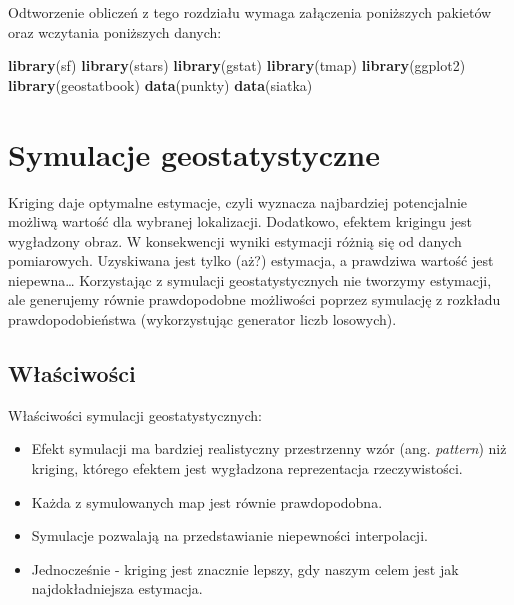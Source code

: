 \documentclass[
  paper=6in:9in,pagesize=pdftex,headinclude=on,footinclude=on,10pt]{scrbook}
\newenvironment{Shaded}{\begin{snugshade}}{\end{snugshade}}
\newcommand{\FunctionTok}[1]{\textcolor[rgb]{0.13,0.29,0.53}{\textbf{#1}}}
\newcommand{\NormalTok}[1]{#1}
\providecommand{\tightlist}{%
  \setlength{\itemsep}{0pt}\setlength{\parskip}{0pt}}
\begin{document}
Odtworzenie obliczeń z tego rozdziału wymaga załączenia poniższych pakietów oraz wczytania poniższych danych:

\begin{Shaded}
\begin{Highlighting}[]
\FunctionTok{library}\NormalTok{(sf)}
\FunctionTok{library}\NormalTok{(stars)}
\FunctionTok{library}\NormalTok{(gstat)}
\FunctionTok{library}\NormalTok{(tmap)}
\FunctionTok{library}\NormalTok{(ggplot2)}
\FunctionTok{library}\NormalTok{(geostatbook)}
\FunctionTok{data}\NormalTok{(punkty)}
\FunctionTok{data}\NormalTok{(siatka)}
\end{Highlighting}
\end{Shaded}

\section{Symulacje geostatystyczne}\label{symulacje-geostatystyczne}

Kriging daje optymalne estymacje, czyli wyznacza najbardziej potencjalnie możliwą wartość dla wybranej lokalizacji.
Dodatkowo, efektem krigingu jest wygładzony obraz.
W konsekwencji wyniki estymacji różnią się od danych pomiarowych.
Uzyskiwana jest tylko (aż?) estymacja, a prawdziwa wartość jest niepewna\ldots{}
Korzystając z symulacji geostatystycznych nie tworzymy estymacji, ale generujemy równie prawdopodobne możliwości poprzez symulację z rozkładu prawdopodobieństwa (wykorzystując generator liczb losowych).

\subsection{Właściwości}\label{wux142aux15bciwoux15bci}

Właściwości symulacji geostatystycznych:

\begin{itemize}
\tightlist
\item
  Efekt symulacji ma bardziej realistyczny przestrzenny wzór (ang. \emph{pattern}) niż kriging, którego efektem jest wygładzona reprezentacja rzeczywistości.
\item
  Każda z symulowanych map jest równie prawdopodobna.
\item
  Symulacje pozwalają na przedstawianie niepewności interpolacji.
\item
  Jednocześnie - kriging jest znacznie lepszy, gdy naszym celem jest jak najdokładniejsza estymacja.
\end{itemize}
\end{document}
